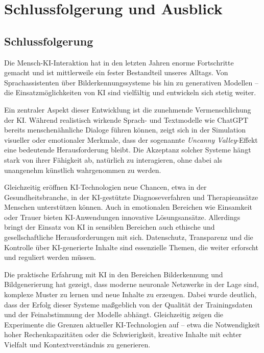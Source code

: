 \documentclass[a4paper,12pt]{article}
\begin{document}


\section{Schlussfolgerung und Ausblick}

\subsection{Schlussfolgerung}

Die Mensch-KI-Interaktion hat in den letzten Jahren enorme Fortschritte gemacht und ist mittlerweile ein fester Bestandteil unseres Alltags. Von Sprachassistenten über Bilderkennungssysteme bis hin zu generativen Modellen – die Einsatzmöglichkeiten von KI sind vielfältig und entwickeln sich stetig weiter.

Ein zentraler Aspekt dieser Entwicklung ist die zunehmende Vermenschlichung der KI. Während realistisch wirkende Sprach- und Textmodelle wie ChatGPT bereits menschenähnliche Dialoge führen können, zeigt sich in der Simulation visueller oder emotionaler Merkmale, dass der sogenannte \textit{Uncanny Valley}-Effekt eine bedeutende Herausforderung bleibt. Die Akzeptanz solcher Systeme hängt stark von ihrer Fähigkeit ab, natürlich zu interagieren, ohne dabei als unangenehm künstlich wahrgenommen zu werden.

Gleichzeitig eröffnen KI-Technologien neue Chancen, etwa in der Gesundheitsbranche, in der KI-gestützte Diagnoseverfahren und Therapieansätze Menschen unterstützen können. Auch in emotionalen Bereichen wie Einsamkeit oder Trauer bieten KI-Anwendungen innovative Lösungsansätze. Allerdings bringt der Einsatz von KI in sensiblen Bereichen auch ethische und gesellschaftliche Herausforderungen mit sich. Datenschutz, Transparenz und die Kontrolle über KI-generierte Inhalte sind essenzielle Themen, die weiter erforscht und reguliert werden müssen.

Die praktische Erfahrung mit KI in den Bereichen Bilderkennung und Bildgenerierung hat gezeigt, dass moderne neuronale Netzwerke in der Lage sind, komplexe Muster zu lernen und neue Inhalte zu erzeugen. Dabei wurde deutlich, dass der Erfolg dieser Systeme maßgeblich von der Qualität der Trainingsdaten und der Feinabstimmung der Modelle abhängt. Gleichzeitig zeigen die Experimente die Grenzen aktueller KI-Technologien auf – etwa die Notwendigkeit hoher Rechenkapazitäten oder die Schwierigkeit, kreative Inhalte mit echter Vielfalt und Kontextverständnis zu generieren.
\end{document}
